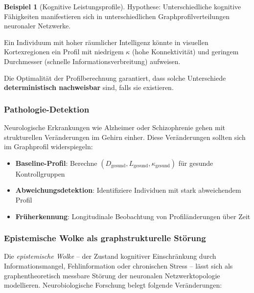 ﻿\documentclass[a4paper,12pt]{article}
\theoremstyle{definition}
\newtheorem{beispiel}{Beispiel}
\begin{document}
	\begin{beispiel}[Kognitive Leistungsprofile]
		Hypothese: Unterschiedliche kognitive Fähigkei\-ten manifestieren sich in unterschiedlichen Graphprofilverteilungen neuronaler Netzwerke. 
		
		Ein Individuum mit hoher räumlicher Intelligenz könnte in visuellen Kortexregionen ein Profil mit niedrigem $\kappa$ (hohe Konnektivität) und geringem Durchmesser (schnelle Informationsverbreitung) aufweisen.
		
		Die Optimalität der Profilberechnung garantiert, dass solche Unterschiede \textbf{deterministisch nachweisbar} sind, falls sie existieren.
	\end{beispiel}
	
	\subsubsection{Pathologie-Detektion}
	
	Neurologische Erkrankungen wie Alzheimer oder Schizophrenie gehen mit strukturellen Veränderungen im Gehirn einher. Diese Veränderungen sollten sich im Graphprofil widerspiegeln:
	
	\begin{itemize}
		\item[-] \textbf{Baseline-Profil}: Berechne $(D_{\text{gesund}}, L_{\text{gesund}}, \kappa_{\text{gesund}})$ für gesunde Kontrollgruppen
		\item[-] \textbf{Abweichungsdetektion}: Identifiziere Individuen mit stark abweichendem Profil
		\item[-] \textbf{Früherkennung}: Longitudinale Beobachtung von Profiländerungen über Zeit
	\end{itemize}

	\subsubsection{Epistemische Wolke als graphstrukturelle Störung}

	Die \emph{epistemische Wolke} -- der Zustand kognitiver Einschränkung durch Informationsmangel, Fehlinformation oder chronischen Stress -- lässt sich als graphentheoretisch messbare Störung der neuronalen Netzwerktopologie modellieren. Neurobiologische Forschung belegt folgende Veränderungen:
\end{document}
